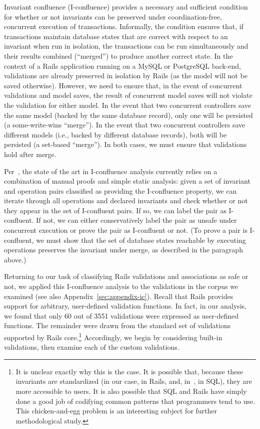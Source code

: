 Invariant confluence (I-confluence) provides a necessary and
sufficient condition for whether or not invariants can be preserved
under coordination-free, concurrent execution of
transactions. Informally, the condition ensures that, if transactions
maintain database states that are correct with respect to an invariant
when run in isolation, the transactions can be run simultaneously and
their results combined (``merged'') to produce another correct
state. In the context of a Rails application running on a MySQL or
PostgreSQL back-end, validations are already preserved in isolation by
Rails (as the model will not be saved otherwise). However, we need to
ensure that, in the event of concurrent validations and model saves,
the result of concurrent model saves will not violate the validation
for either model. In the event that two concurrent controllers save
the same model (backed by the same database record), only one will be
persisted (a some-write-wins ``merge''). In the event that two
concurrent controllers save different models (i.e., backed by
different database records), both will be persisted (a set-based
``merge''). In both cases, we must ensure that validations hold after
merge.

Per~\cite{coord-avoid}, the state of the art in I-confluence
analysis currently relies on a combination of manual proofs and simple
static analysis: given a set of invariant and operation pairs
classified as providing the I-confluence property, we can
iterate through all operations and declared invariants and check
whether or not they appear in the set of I-confluent pairs. If
so, we can label the pair as I-confluent. If not, we can
either conservatively label the pair as unsafe under concurrent
execution or prove the pair as I-confluent or not. (To prove a
pair is I-confluent, we must show that the set of database
states reachable by executing operations preserves the invariant under
merge, as described in the paragraph above.)

Returning to our task of classifying Rails validations and
associations as safe or not, we applied this I-confluence analysis to
the validations in the corpus we examined (see also
Appendix~\ref{sec:appendix-ic}). Recall that Rails provides
support for arbitrary, user-defined validation functions. In fact, in
our analysis, we found that only 60 out of 3551 validations were
expressed as user-defined functions. The remainder were drawn from the
standard set of validations supported by Rails core.\footnote{It is
  unclear exactly why this is the case. It is possible that, because
  these invariants are standardized (in our case, in Rails, and,
  in~\cite{coord-avoid}, in SQL), they are more accessible to
  users. It is also possible that SQL and Rails have simply done a
  good job of codifying common patterns that programmers tend to
  use. This chicken-and-egg problem is an interesting subject for
  further methodological study.} Accordingly, we begin by considering
built-in validations, then examine each of the custom validations.

